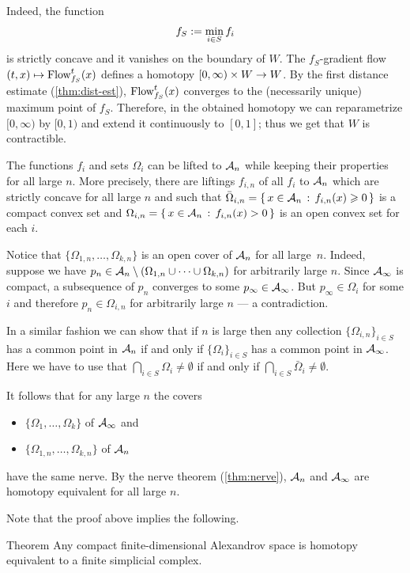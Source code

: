 Indeed, the function
\[f_S\mathrel{:=}\min_{i\in S} f_i\]
is strictly concave and it vanishes on the boundary of $W$.
The $f_S$-gradient flow $(t,x)\mapsto \mathop{\rm Flow}\nolimits_{f_S}^t(x)$ defines a homotopy
$[0,\infty)\times W\z\to W$.
By the first distance estimate (\ref{thm:dist-est}), $\mathop{\rm Flow}\nolimits_{f_S}^t(x)$ converges to the (necessarily unique) maximum point of $f_S$.
Therefore, in the obtained homotopy we can reparametrize $[0,\infty)$ by $[0,1)$ and extend it continuously to $[0,1]$;
thus we get that $W$ is contractible.


The functions $f_i$ and sets $\Omega_i$ can be lifted to $\mathcal{A}_n$ while keeping their properties for all large $n$.
More precisely, there are liftings $f_{i,n}$ of all $f_i$ to $\mathcal{A}_n$ which are strictly concave for all large $n$ and such that $\bar\Omega_{i,n}=\set{x\in \spc{A}_n}{f_{i,n}(x)\ge 0}$ is a compact convex set and $\Omega_{i,n}\z=\set{x\in \spc{A}_n}{f_{i,n}(x)> 0}$ is an open convex set for each $i$.

Notice that $\{\Omega_{1,n},\dots,\Omega_{k,n}\}$ is an open cover of $\mathcal{A}_n$ for all large~$n$.
Indeed, suppose we have $p_n\in \mathcal{A}_n\setminus(\Omega_{1,n}\cup\dots\cup\Omega_{k,n})$ for arbitrarily large $n$.
Since $\mathcal{A}_\infty$ is compact, a subsequence of $p_n$ converges to some $p_\infty\in\mathcal{A}_\infty$.
But $p_\infty\in\Omega_i$ for some $i$ and therefore $p_n\in \Omega_{i,n}$ for arbitrarily large $n$ --- a contradiction.

In a similar fashion we can show that if $n$ is large then any collection $\{\Omega_{i,n}\}_{i\in S}$ has a common point in $\mathcal{A}_n$
if and only if $\{\Omega_{i}\}_{i\in S}$ has a common point in $\mathcal{A}_\infty$.
Here we have to use that $\bigcap_{i\in S}\Omega_{i}\ne \emptyset$ if and only if $\bigcap_{i\in S}\bar\Omega_{i}\ne \emptyset$.

It follows that for any large $n$ the covers
\begin{itemize}
\item $\{\Omega_{1},\dots,\Omega_{k}\}$ of $\mathcal{A}_\infty$ and
\item $\{\Omega_{1,n},\dots,\Omega_{k,n}\}$ of $\mathcal{A}_n$
\end{itemize}
have the same nerve.
By the nerve theorem (\ref{thm:nerve}), $\mathcal{A}_n$ and $\mathcal{A}_\infty$ are homotopy equivalent for all large $n$.
\qeds

Note that the proof above implies the following.

\begin{thm}{Theorem}\label{thm:finite-dim-hom-simplicial}
Any compact finite-dimensional Alexandrov space is homotopy equivalent to a finite simplicial complex.
\end{thm}

